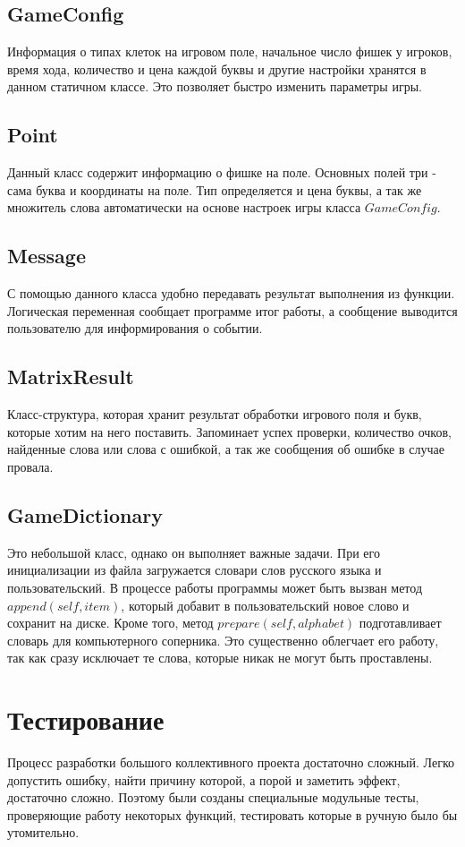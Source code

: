 \documentclass[a4paper,14pt]{article}
\begin{document}
	\subsection{GameConfig}
	Информация о типах клеток на игровом поле, начальное число фишек у игроков, время хода, количество и цена каждой буквы и другие настройки хранятся в данном статичном классе. Это позволяет быстро изменить параметры игры.
	
	\subsection{Point}
	Данный класс содержит информацию о фишке на поле. Основных полей три - сама буква и координаты на поле. Тип определяется и цена буквы, а так же множитель слова автоматически на основе настроек игры класса $GameConfig$.
	
	\subsection{Message}
	С помощью данного класса удобно передавать результат выполнения из функции. Логическая переменная сообщает программе итог работы, а сообщение выводится пользователю для информирования о событии.
	
	\subsection{MatrixResult}
	Класс-структура, которая хранит результат обработки игрового поля и букв, которые хотим на него поставить. Запоминает успех проверки, количество очков, найденные слова или слова с ошибкой, а так же сообщения об ошибке в случае провала.
	
	\subsection{GameDictionary}
	Это небольшой класс, однако он выполняет важные задачи. При его инициализации из файла загружается словари слов русского языка и пользовательский. В процессе работы программы может быть вызван метод $append(self, item)$, который добавит в пользовательский новое слово и сохранит на диске. Кроме того, метод $prepare(self, alphabet)$ подготавливает словарь для компьютерного соперника. Это существенно облегчает его работу, так как сразу исключает те слова, которые никак не могут быть проставлены.
	
\section{Тестирование}
	Процесс разработки большого коллективного проекта достаточно сложный. Легко допустить ошибку, найти причину которой, а порой и заметить эффект, достаточно сложно. Поэтому были созданы специальные модульные тесты, проверяющие работу некоторых функций, тестировать которые в ручную было бы утомительно.
	
\end{document}
